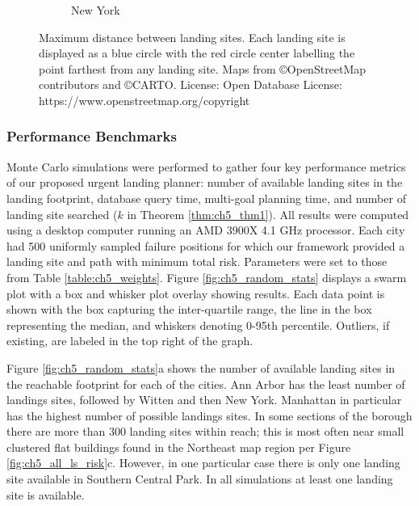 \begin{figure}[!t]
\begin{subfigure}[b]{0.45\textwidth}
   \caption{New York}\label{subfig-1:dummy}
 \end{subfigure}
 \caption[Maximum distance between landing sites]{Maximum distance between landing sites. Each landing site is displayed as a blue circle with the red circle center labelling the point farthest from any landing site. Maps from \copyright OpenStreetMap contributors and \copyright CARTO. License: Open Database License: https://www.openstreetmap.org/copyright}\label{fig:ch5_farthest_landing_site}
\end{figure}



\subsubsection{Performance Benchmarks}\label{sec:ch5_key_metrics}

Monte Carlo simulations were performed to gather four key performance metrics of our proposed urgent landing planner: number of available landing sites in the landing footprint, database query time, multi-goal planning time, and number of landing site searched ($k$ in Theorem \ref{thm:ch5_thm1}). All results were computed using a desktop computer running an AMD 3900X 4.1 GHz processor. Each city had 500 uniformly sampled failure positions for which our framework provided a landing site and path with minimum total risk. Parameters were set to those from Table \ref{table:ch5_weights}. Figure \ref{fig:ch5_random_stats} displays a swarm plot with a box and whisker plot overlay showing results. Each data point is shown with the box capturing the inter-quartile range, the line in the box representing the median, and whiskers denoting 0-95th percentile. Outliers, if existing, are labeled in the top right of the graph. 

Figure \ref{fig:ch5_random_stats}a shows the number of available landing sites in the reachable footprint for each of the cities.  Ann Arbor has the least number of landings sites, followed by Witten and then New York. Manhattan in particular has the highest number of possible landings sites.  In some sections of the borough there are more than 300 landing sites within reach; this is most often near small clustered flat buildings found in the Northeast map region per Figure \ref{fig:ch5_all_ls_risk}c. However, in one particular case there is only one landing site available in Southern Central Park. In all simulations at least one landing site is available.

